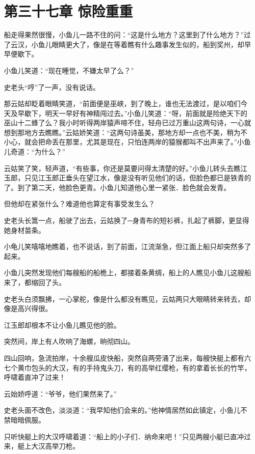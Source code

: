 \documentclass[12pt,oneside]{book}
\begin{document}
\hypertarget{ux7b2cux4e09ux5341ux4e03ux7ae0-ux60caux9669ux91cdux91cd}{%
\chapter{第三十七章
惊险重重}\label{ux7b2cux4e09ux5341ux4e03ux7ae0-ux60caux9669ux91cdux91cd}}

船走得果然很慢，小鱼儿一路不住的问：``这是什么地方？这里到了什么地方？''过了云汉，小鱼儿眼睛更大了，像是在等着瞧有什么趣事发生似的，船到奖州，却早早便歇下。

小鱼儿笑道：``现在睡觉，不嫌太早了么？''

史老头``哼''了一声，没有说话。

那云姑却眨着眼睛笑道，``前面便是巫峡，到了晚上，谁也无法渡过，是以咱们今天及早歇下，明天一早好有神精闯过去。''小鱼儿笑道：``呀，前面就是险绝天下的巫山十二蜂了么？我小时听得两岸猿声啼不住，轻舟已过万重山这两句诗，一心就想到那地方去瞧瞧。''云姑娇笑道：``这两句诗虽美，那地方却一点也不美，稍为不小心，就会把命丢在那里，尤其是现在，只怕连两岸的猿猴都叫不出声来了。''小鱼儿奇道：``为什么？''

云姑笑了笑，轻声道，``有些事，你还是莫要问得太清楚的好。''小鱼儿转头去瞧江玉郎，只见江玉郎正垂头在望江水，像是没有听见他们的话，但脸色都已是铁青的了。到了第二天，他脸色更青。小鱼儿知道他心里一紧张．脸色就会发青。

但他却在紧张什么？难道他也算定有事受发生么？

史老头长篙一点，船驶了出去，云姑换了─身青布的短衫裤，扎起了裤脚，更显得她身材苗条。

小龟儿笑嘻嘻地瞧着，也不说话，到了前面，江流渐急，但江面上船只却突然多了起来。

小鱼儿突然发现他们每艘船的船桅上，都接着条黄绸，船上的人瞧见小鱼儿这艘船来了，都缩回了头。

史老头白须飘拂，一心掌舵，像是什么都没有瞧见，云姑两只大眼睛转来转去，却像是高兴得很。

江玉郎却根本不让小鱼儿瞧见他的脸。

突然间，岸上有人吹响了海螺，晌彻四山。

四山回响，急流拍岸，十余艘瓜皮快船，突然自两旁涌了出来，每艘快艇上都有六七个黄巾包头的大汉，有的手持鬼头刀，有的高举红缨枪，有的拿着长长的竹竿，呼啸着直冲了过来！

云始娇呼道：``爷爷，他们果然来了。''

史老头面不改色，淡淡道：``我早知他们会来的。''他神情居然如此镇定，小鱼儿不禁暗暗佩服。

只听快艇上的大汉呼啸着道：``船上的小子们．纳命来吧！''只见两艘小艇已直冲过来，艇上大汉高举刀枪。
\end{document}
